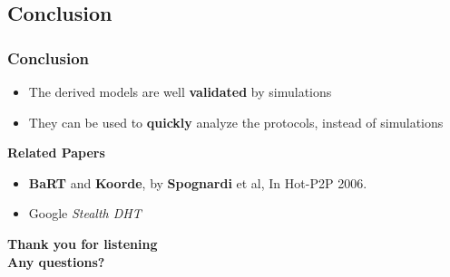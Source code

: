 \documentclass[xcolor=pdftex,dvipsnames,table]{beamer}
\begin{document}
\subsection{Conclusion}
\begin{frame}
    \frametitle{Conclusion}
    \vspace{-0.5in}
        \begin{itemize}
            \item{The derived models are  well \textbf{validated} by simulations}
            \item{They can be used to \textbf{quickly} analyze the protocols, instead of simulations}
        \end{itemize}
\vspace{0.2in}
       \textbf{ Related Papers}
         \begin{itemize}
            \item  \textbf{BaRT} and \textbf{Koorde}, by \textbf{Spognardi} et al, In
                   Hot-P2P 2006.
            \item  Google \emph{Stealth DHT}
         \end{itemize}

\end{frame}


\begin{frame}
  \begin{center}
    \textbf{Thank you for listening\\
    Any questions?\\}
    \titlepage
  \end{center}
\end{frame}
\end{document}
